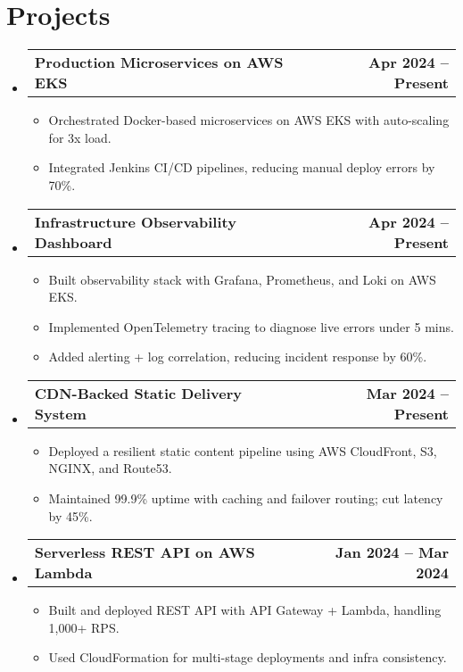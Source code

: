 \documentclass[a4paper, 10pt]{article}
\makeatletter
\newcommand{\resumeProjectHeading}[2]{
    \item
    \begin{tabular*}{\textwidth}{l@{\extracolsep{\fill}}r}
      \textbf{#1} & \textbf{#2}
    \end{tabular*}
    \vspace{-10pt}
}
\makeatother
\begin{document}
\section{Projects}
\vspace{-5pt}
\begin{itemize}[leftmargin=0in, label={}]
  \resumeProjectHeading{Production Microservices on AWS EKS}{Apr 2024 – Present}
  \begin{itemize}
    \item Orchestrated Docker-based microservices on AWS EKS with auto-scaling for 3x load.
    \item Integrated Jenkins CI/CD pipelines, reducing manual deploy errors by 70\%.
  \end{itemize}

  \resumeProjectHeading{Infrastructure Observability Dashboard}{Apr 2024 – Present}
  \begin{itemize}
    \item Built observability stack with Grafana, Prometheus, and Loki on AWS EKS.
    \item Implemented OpenTelemetry tracing to diagnose live errors under 5 mins.
    \item Added alerting + log correlation, reducing incident response by 60\%.
  \end{itemize}

  \resumeProjectHeading{CDN-Backed Static Delivery System}{Mar 2024 – Present}
  \begin{itemize}
    \item Deployed a resilient static content pipeline using AWS CloudFront, S3, NGINX, and Route53.
    \item Maintained 99.9\% uptime with caching and failover routing; cut latency by 45\%.
  \end{itemize}

  \resumeProjectHeading{Serverless REST API on AWS Lambda}{Jan 2024 – Mar 2024}
  \begin{itemize}
    \item Built and deployed REST API with API Gateway + Lambda, handling 1,000+ RPS.
    \item Used CloudFormation for multi-stage deployments and infra consistency.
  \end{itemize}
\end{itemize}

\vspace{-10pt}
\end{document}
